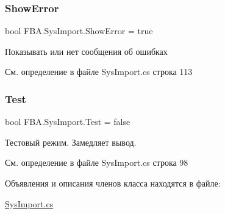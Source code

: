 \subsubsection{\texorpdfstring{Show\+Error}{ShowError}}
{\footnotesize\ttfamily bool F\+B\+A.\+Sys\+Import.\+Show\+Error = true}



Показывать или нет сообщения об ошибках 



См. определение в файле Sys\+Import.\+cs строка 113

\mbox{\label{class_f_b_a_1_1_sys_import_a5e5ac2b328fcbd766b66a7db7834b5b9}} 
\subsubsection{\texorpdfstring{Test}{Test}}
{\footnotesize\ttfamily bool F\+B\+A.\+Sys\+Import.\+Test = false}



Тестовый режим. Замедляет вывод. 



См. определение в файле Sys\+Import.\+cs строка 98



Объявления и описания членов класса находятся в файле\+:\begin{DoxyCompactItemize}
\item 
\mbox{\hyperlink{_sys_import_8cs}{Sys\+Import.\+cs}}\end{DoxyCompactItemize}
